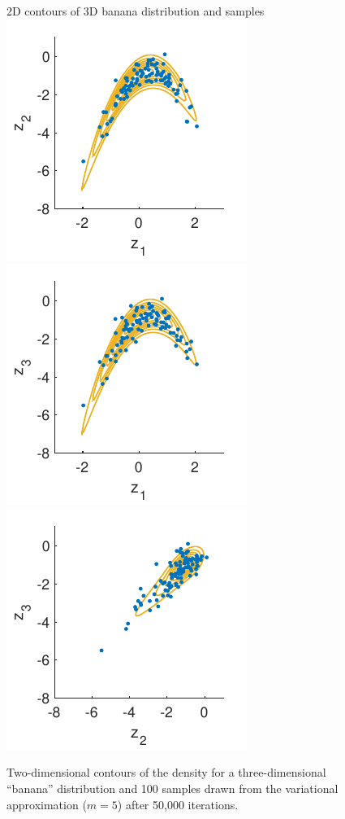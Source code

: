 \documentclass[10pt]{article}
\begin{document}
\begin{figure}[t]
\centering
\small{2D contours of 3D banana distribution and samples} \\
\includegraphics{images/banana3D_usivi_ContourSamples_XY.pdf}
\includegraphics{images/banana3D_usivi_ContourSamples_XZ.pdf}
\includegraphics{images/banana3D_usivi_ContourSamples_YZ.pdf}
\caption{Two-dimensional contours of the density for a three-dimensional ``banana'' distribution and 100 samples drawn from the \uivi variational approximation ($m=5$) after 50,000 \sgd iterations.}
\label{fig:3Dbanana}
\end{figure}
\end{document}
